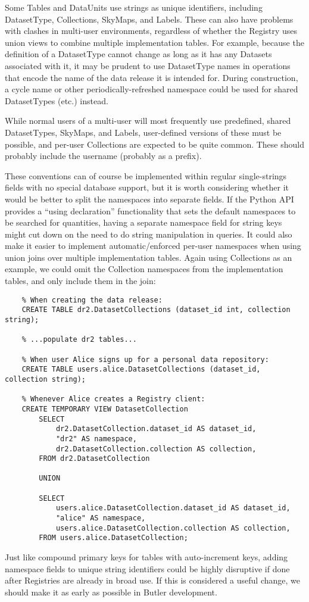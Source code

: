 \documentclass[DM,toc]{lsstdoc}
\begin{document}
Some Tables and DataUnits use strings as unique identifiers, including DatasetType, Collections, SkyMaps, and Labels.
These can also have problems with clashes in multi-user environments, regardless of whether the Registry uses union views to combine multiple implementation tables.
For example, because the definition of a DatasetType cannot change as long as it has any Datasets associated with it, it may be prudent to use DatasetType names in operations that encode the name of the data release it is intended for.
During construction, a cycle name or other periodically-refreshed namespace could be used for shared DatasetTypes (etc.) instead.

While normal users of a multi-user will most frequently use predefined, shared DatasetTypes, SkyMaps, and Labels, user-defined versions of these must be possible, and per-user Collections are expected to be quite common.
These should probably include the username (probably as a prefix).

These conventions can of course be implemented within regular single-strings fields with no special database support, but it is worth considering whether it would be better to split the namespaces into separate fields.
If the Python API provides a ``using declaration'' functionality that sets the default namespaces to be searched for quantities, having a separate namespace field for string keys might cut down on the need to do string manipulation in queries.
It could also make it easier to implement automatic/enforced per-user namespaces when using union joins over multiple implementation tables.
Again using Collections as an example, we could omit the Collection namespaces from the implementation tables, and only include them in the join:
\begin{verbatim}
    % When creating the data release:
    CREATE TABLE dr2.DatasetCollections (dataset_id int, collection string);

    % ...populate dr2 tables...

    % When user Alice signs up for a personal data repository:
    CREATE TABLE users.alice.DatasetCollections (dataset_id, collection string);

    % Whenever Alice creates a Registry client:
    CREATE TEMPORARY VIEW DatasetCollection
        SELECT
            dr2.DatasetCollection.dataset_id AS dataset_id,
            "dr2" AS namespace,
            dr2.DatasetCollection.collection AS collection,
        FROM dr2.DatasetCollection
        
        UNION
        
        SELECT
            users.alice.DatasetCollection.dataset_id AS dataset_id,
            "alice" AS namespace,
            users.alice.DatasetCollection.collection AS collection,
        FROM users.alice.DatasetCollection;
\end{verbatim}

Just like compound primary keys for tables with auto-increment keys, adding namespace fields to unique string identifiers could be highly disruptive if done after Registries are already in broad use.
If this is considered a useful change, we should make it as early as possible in Butler development.
\end{document}
